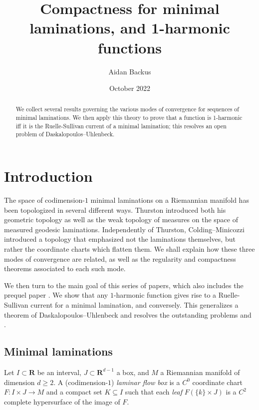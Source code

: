 \documentclass[reqno,11pt]{amsart}
\title{Compactness for minimal laminations, and 1-harmonic functions}
\author{Aidan Backus}
\date{October 2022}
\newcommand{\RR}{\mathbf{R}}
\newcommand{\dfn}[1]{\emph{#1}\index{#1}}
\theoremstyle{definition}
\numberwithin{equation}{section}
\begin{document}
\begin{abstract}
We collect several results governing the various modes of convergence for sequences of minimal laminations.
We then apply this theory to prove that a function is 1-harmonic iff it is the Ruelle-Sullivan current of a minimal lamination; this resolves an open problem of Daskalopoulos--Uhlenbeck.
\end{abstract}

\maketitle



\section{Introduction}
The space of codimension-$1$ minimal laminations on a Riemannian manifold has been topologized in several different ways.
Thurston \cite[Chapter 8]{thurston1979geometry} introduced both his geometric topology as well as the weak topology of measures on the space of measured geodesic laminations.
Independently of Thurston, Colding--Minicozzi \cite[Appendix B]{ColdingMinicozziIV} introduced a topology that emphasized not the laminations themselves, but rather the coordinate charts which flatten them.
We shall explain how these three modes of convergence are related, as well as the regularity and compactness theorems associated to each such mode.

We then turn to the main goal of this series of papers, which also includes the prequel paper \cite{BackusFLG}.
We show that any $1$-harmonic function gives rise to a Ruelle-Sullivan current for a minimal lamination, and conversely.
This generalizes a theorem of Daskalopoulos--Uhlenbeck \cite[Theorem 6.1]{daskalopoulos2020transverse} and resolves the outstanding problems \cite[Problem 9.4]{daskalopoulos2020transverse} and \cite[Conjecture 9.5]{daskalopoulos2020transverse}.

\subsection{Minimal laminations}\label{Lams sections}
Let $I \subset \RR$ be an interval, $J \subset \RR^{d - 1}$ a box, and $M$ a Riemannian manifold of dimension $d \geq 2$.
A (codimension-$1$) \dfn{laminar flow box} is a $C^0$ coordinate chart $F: I \times J \to M$ and a compact set $K \subseteq I$ such that each \dfn{leaf} $F(\{k\} \times J)$ is a $C^2$ complete hypersurface of the image of $F$.
\end{document}
